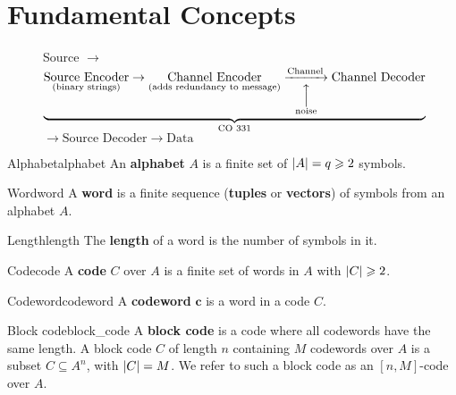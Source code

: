\section{Fundamental Concepts}

\begin{figure}[h]
    \centering
    Source
    $ \rightarrow $
    $ \underbrace{
            \underset{\text{(binary strings)}}{\text{Source Encoder}}
            \rightarrow
            \underset{\text{(adds redundancy to message)}}{\text{Channel Encoder}}
            \underset{\overset{\Big\uparrow}{\text{noise}}}{\xrightarrow{\text{Channel}}}
            \text{Channel Decoder}}_{\text{CO 331}}$
    $ \rightarrow \text{Source Decoder} \rightarrow \text{Data} $
\end{figure}

\begin{Definition}{Alphabet}{alphabet}
    An \textbf{alphabet} $ A $ is a finite set of $ \lvert A\rvert= q\geqslant 2 $ symbols.
\end{Definition}

\begin{Definition}{Word}{word}
    A \textbf{word} is a finite sequence (\textbf{tuples} or \textbf{vectors})
    of symbols from an alphabet $ A $.
\end{Definition}

\begin{Definition}{Length}{length}
    The \textbf{length} of a word is the number of symbols in it.
\end{Definition}

\begin{Definition}{Code}{code}
    A \textbf{code} $ C $ over $ A $ is a finite set of words in $ A $
    with $ \lvert C\rvert\geqslant 2 $.
\end{Definition}

\begin{Definition}{Codeword}{codeword}
    A \textbf{codeword} $ \bm{c} $ is a word in a code $ C $.
\end{Definition}

\begin{Definition}{Block code}{block_code}
    A \textbf{block code} is a code where all codewords have the same length.
    A block code $ C $ of length $ n $ containing $ M $ codewords over $ A $
    is a subset $ C\subseteq A^n $, with $ \lvert C\rvert=M $. We refer to such a block
    code as an $ [n,M] $-code over $ A $.
\end{Definition}

